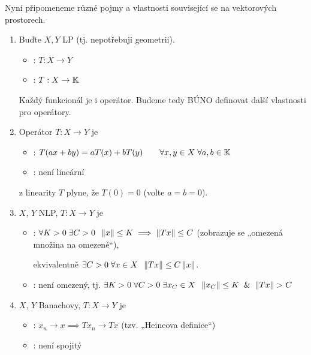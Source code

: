 \phantom{.}

Nyní připomeneme různé pojmy a vlastnosti související se  na vektorových prostorech.
\begin{enumerate}
    \item Buďte $X,Y$ LP (tj. nepotřebuji geometrii).
    \begin{itemize}
        \item {}: $T: X \to Y$
        \item {}: $T: X \to \mathbb{K}$
    \end{itemize}
    Každý funkcionál je i operátor. Budeme tedy BÚNO definovat další vlastnosti pro operátory.
    
    \item Operátor $T: X \to Y$ je
    \begin{itemize}
        \item {}: $T(ax + by) = a T(x) + b T(y) \hspace{2em} \forall x,y \in X \; \forall a,b \in \mathbb{K}$
        \item {}: není lineární
    \end{itemize}
    
    \Poznamka z linearity $T$ plyne, že $T(0) = 0$ (volte $a=b=0$).
    
    \item $X$, $Y$ NLP, $T: X \to Y$ je
    \begin{itemize}
        \item {}: $\forall K>0 \; \exists C>0 \;\; \left\lVert x\right\rVert \leq K \implies \left\lVert Tx\right\rVert \leq C$ (zobrazuje se „omezená množina na omezené“),
        
        ekvivalentně $\exists C>0 \; \forall x \in X \;\; \left\lVert Tx\right\rVert \leq C \left\lVert x\right\rVert $.
        
        \item {}: není omezený, tj. $\exists K>0 \; \forall C>0 \; \exists x_C \in X \;\; \norm{x_C} \leq K \And \norm{Tx} > C$
    \end{itemize}
    
    \item $X$, $Y$ Banachovy, $T: X \to Y$ je
    \begin{itemize}
        \item {}: $x_n \to x \implies T x_n \to T x$ (tzv. „Heineova definice“)
        
        \item {}: není spojitý
    \end{itemize}
\end{enumerate}

